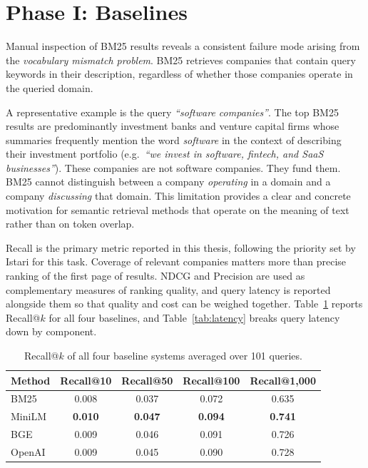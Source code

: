 \documentclass[a4paper,oneside,bibliography=totoc]{scrbook}
\begin{document}
\section{Phase I: Baselines}
\label{sec:phase1_result}

\label{sec:baseline_sparse_result}
\label{subsec:bm25_qual}

Manual inspection of BM25 results reveals a consistent failure mode arising from the \textit{vocabulary mismatch problem}. BM25 retrieves companies that contain query keywords in their description, regardless of whether those companies operate in the queried domain.

A representative example is the query \textit{``software companies''}. The top BM25 results are predominantly investment banks and venture capital firms whose summaries frequently mention the word \textit{software} in the context of describing their investment portfolio (e.g.\ \textit{``we invest in software, fintech, and SaaS businesses''}). These companies are not software companies. They fund them. BM25 cannot distinguish between a company \textit{operating} in a domain and a company \textit{discussing} that domain. This limitation provides a clear and concrete motivation for semantic retrieval methods that operate on the meaning of text rather than on token overlap.


\label{sec:exp_results}
\label{sec:exp_runtime_result}

Recall is the primary metric reported in this thesis, following the priority set by Istari for this task. Coverage of relevant companies matters more than precise ranking of the first page of results. NDCG and Precision are used as complementary measures of ranking quality, and query latency is reported alongside them so that quality and cost can be weighed together. Table~\ref{tab:main_results} reports Recall@$k$ for all four baselines, and Table~\ref{tab:latency} breaks query latency down by component.

\begin{table}[ht]
\centering
\caption{Recall@$k$ of all four baseline systems averaged over 101 queries.}
\label{tab:main_results}
\begin{tabular}{lcccc}
\toprule
\textbf{Method} & \textbf{Recall@10} & \textbf{Recall@50} & \textbf{Recall@100} & \textbf{Recall@1{,}000} \\
\midrule
BM25   & 0.008 & 0.037 & 0.072 & 0.635 \\
MiniLM & \textbf{0.010} & \textbf{0.047} & \textbf{0.094} & \textbf{0.741} \\
BGE    & 0.009 & 0.046 & 0.091 & 0.726 \\
OpenAI & 0.009 & 0.045 & 0.090 & 0.728 \\
\bottomrule
\end{tabular}
\end{table}
\end{document}
